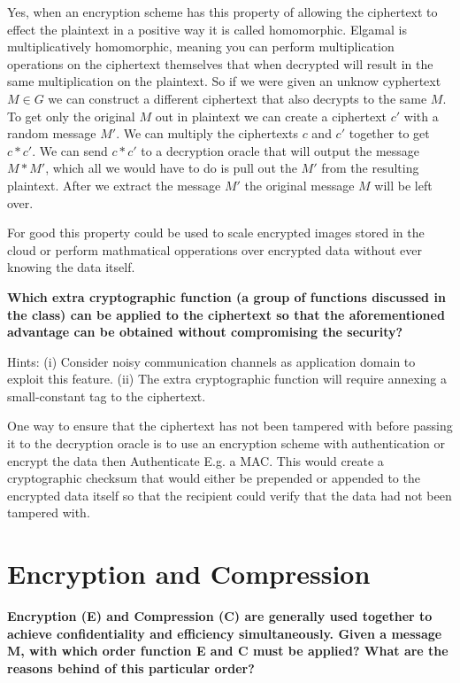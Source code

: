 \documentclass[letterpaper,11pt,notitlepage,fleqn]{article}
\begin{document}
Yes, when an encryption scheme has this property of allowing the ciphertext to effect the plaintext in a positive way it is called homomorphic. Elgamal is multiplicatively homomorphic, meaning you can perform multiplication operations on the ciphertext themselves that when decrypted will result in the same multiplication on the plaintext. So if we were given an unknow cyphertext $M \in G$ we can construct a different ciphertext that also decrypts to the same $M$. To get only the original
$M$ out in plaintext we can create a ciphertext $c'$ with a random message $M'$. We can multiply the ciphertexts $c$ and
$c'$ together to get $c*c'$. We can send $c*c'$ to a decryption oracle that will output the message $M*M'$, which all we would have to do is pull out the $M'$ from the resulting plaintext. After we extract the message $M'$ the original message $M$ will be left over. 

For good this property could be used to scale encrypted images stored in the cloud or perform mathmatical opperations over encrypted data without ever knowing the data itself. 

\noindent \textbf{Which  extra  cryptographic  function  (a  group  of  functions  discussed  in  the  class)  can be applied to the ciphertext so that the aforementioned advantage can be obtained without compromising the security?}

\noindent Hints:  (i) Consider  noisy  communication  channels  as  application  domain  to  exploit  this  feature. 
(ii) The extra cryptographic function will require annexing a small-constant tag to the ciphertext. 

One way to ensure that the ciphertext has not been tampered with before passing it to the decryption oracle is to use an encryption scheme with authentication or encrypt the data then Authenticate E.g. a MAC. This would create a cryptographic checksum that would either be prepended or appended to the encrypted data itself so that the recipient could verify that the data had not been tampered with. 

\section{Encryption and Compression}
\noindent \textbf{Encryption (E) and Compression (C) are generally used together to achieve confidentiality and  efficiency  simultaneously. Given  a message M, with which order  function E  and C must be applied? What are the reasons behind of this particular order?}
\end{document}
